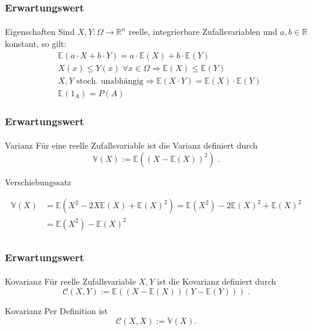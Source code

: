 \documentclass{beamer}
\begin{document}
 \begin{frame}
    \frametitle{Erwartungswert}
\framesubtitle{}
\begin{block}{Eigenschaften}
Sind $X,Y : \Omega \to \mathbb{R}^n$   reelle, integrierbare  Zufallsvariablen und $a,b \in \mathbb{R}$ konstant, so gilt:
\begin{align*}
& \mathbb{E}(a \cdot X + b \cdot Y) = a \cdot \mathbb{E}(X) + b \cdot \mathbb{E}(Y) \\
& X(x) \leq Y(x) \;  \forall x \in \Omega \Rightarrow \mathbb{E}(X) \leq \mathbb{E}(Y) \\
& X ,Y \text{ stoch. unabhängig} \Rightarrow   \mathbb{E}(X \cdot Y) =  \mathbb{E}(X) \cdot  \mathbb{E}(Y) \\
& \mathbb{E} (1_A) = P (A)
\end{align*}
\end{block}
 \end{frame}

 \begin{frame}
    \frametitle{Erwartungswert}
\framesubtitle{}
\begin{block}{Varianz}
Für eine reelle Zufallsvariable ist die Varianz definiert durch
$$ \mathbb{V} (X) :=  \mathbb{E}( (X - \mathbb{E}(X))^2) \; .$$
\end{block}
\begin{block}{Verschiebungssatz}

\begin{align*}
 \mathbb{V}(X) & = \mathbb{E}(X^2 - 2X \mathbb{E}(X) + \mathbb{E}(X)^2) = \mathbb{E}(X^2) - 2 \mathbb{E}(X)^2 +  \mathbb{E}(X)^2 \\
& =  \mathbb{E}(X^2) -  \mathbb{E}(X)^2 \\
\end{align*}
\end{block}
 \end{frame}

 \begin{frame}
    \frametitle{Erwartungswert}
\framesubtitle{}
\begin{block}{Kovarianz}
Für  reelle Zufallsvariable $X,Y$ ist die Kovarianz definiert durch
$$ \mathcal{C} (X,Y) :=  \mathbb{E}( (X - \mathbb{E}(X)) (Y - \mathbb{E}(Y))) \; .$$
\end{block}

\begin{block}{Kovarianz}
    Per Definition ist
    $$ \mathcal{C} (X,X) :=  \mathbb{V}(X).$$
    \end{block}
 \end{frame}
\end{document}

